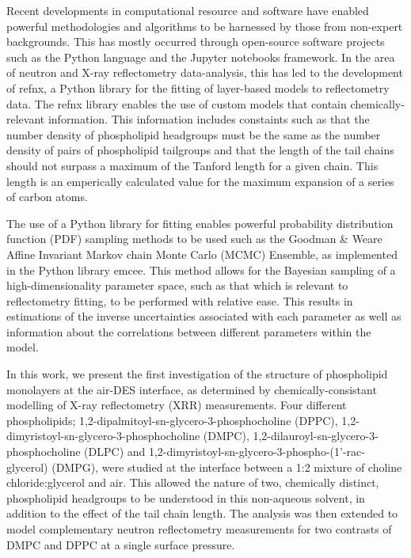 \documentclass[twoside,twocolumn,9pt]{article}
\begin{document}
Recent developments in computational resource and software have enabled powerful methodologies and algorithms to be harnessed by those from non-expert backgrounds. This has mostly occurred through open-source software projects such as the Python language and the Jupyter notebooks framework.\cite{vanRossum1995,Kluyver2016} In the area of neutron and X-ray reflectometry data-analysis, this has led to the development of refnx,\cite{Nelson2018} a Python library for the fitting of layer-based models to reflectometry data. The refnx library enables the use of custom models that contain chemically-relevant information. This information includes constaints such as that the number density of phospholipid headgroups must be the same as the number density of pairs of phospholipid tailgroups and that the length of the tail chains should not surpass a maximum of the Tanford length for a given chain.\cite{Tanford1980} This length is an emperically calculated value for the maximum expansion of a series of carbon atoms. 

The use of a Python library for fitting enables powerful probability distribution function (PDF) sampling methods to be used such as the Goodman \& Weare Affine Invariant Markov chain Monte Carlo (MCMC) Ensemble,\cite{Goodman2010} as implemented in the Python library emcee.\cite{Foreman-Mackey2013} This method allows for the Bayesian sampling of a high-dimensionality parameter space, such as that which is relevant to reflectometry fitting, to be performed with relative ease. This results in estimations of the inverse uncertainties associated with each parameter as well as information about the correlations between different parameters within the model. 

In this work, we present the first investigation of the structure of phospholipid monolayers at the air-DES interface, as determined by chemically-consistant modelling of X-ray reflectometry (XRR) measurements. Four different phospholipids; 1,2-dipalmitoyl-sn-glycero-3-phosphocholine (DPPC), 1,2-dimyristoyl-sn-glycero-3-phosphocholine (DMPC),  1,2-dilauroyl-sn-glycero-3-phosphocholine (DLPC) and 1,2-dimyristoyl-sn-glycero-3-phospho-(1'-rac-glycerol) (DMPG), were studied at the interface between a 1:2 mixture of choline chloride:glycerol and air. This allowed the nature of two, chemically distinct, phospholipid headgroups to be understood in this non-aqueous solvent, in addition to the effect of the tail chain length. The analysis was then extended to model complementary neutron reflectometry measurements for two contrasts of DMPC and DPPC at a single surface pressure. 
\end{document}
